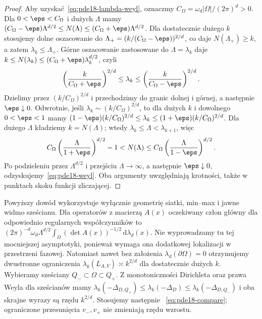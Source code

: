 \begin{proof}
Aby uzyskać~\eqref{eq:pde18-lambda-weyl}, oznaczmy
$C_\Omega=\omega_d|\Omega|/(2\pi)^d>0$. Dla
$0<\eps<C_\Omega$ i dużych $\Lambda$ mamy
$(C_\Omega-\eps)\Lambda^{d/2}\le N(\Lambda)
\le(C_\Omega+\eps)\Lambda^{d/2}$.
Dla dostatecznie dużego $k$ stosujemy dolne oszacowanie
do $\Lambda_+=(k/(C_\Omega-\eps))^{2/d}$, co daje
$N(\Lambda_+)\ge k$, a zatem $\lambda_k\le\Lambda_+$.
Górne oszacowanie zastosowane do $\Lambda=\lambda_k$
daje $k\le N(\lambda_k)\le(C_\Omega+\eps)\lambda_k^{d/2}$,
czyli
\[
 \left(\frac{k}{C_\Omega+\eps}\right)^{2/d}
 \le\lambda_k\le
 \left(\frac{k}{C_\Omega-\eps}\right)^{2/d}.
\]
Dzielimy przez $(k/C_\Omega)^{2/d}$ i przechodzimy
do granic dolnej i górnej, a następnie $\eps\downarrow0$.
Odwrotnie, jeśli $\lambda_k\sim(k/C_\Omega)^{2/d}$,
to dla dużych $k$ i dowolnego $0<\eps<1$ mamy
$(1-\eps)(k/C_\Omega)^{2/d}\le\lambda_k
\le(1+\eps)(k/C_\Omega)^{2/d}$. Dla dużego $\Lambda$
kładziemy $k=N(\Lambda)$; wtedy
$\lambda_k\le\Lambda<\lambda_{k+1}$, więc
\[
 C_\Omega\left(\frac{\Lambda}{1+\eps}\right)^{d/2}-1
 <N(\Lambda)\le
 C_\Omega\left(\frac{\Lambda}{1-\eps}\right)^{d/2}.
\]
Po podzieleniu przez $\Lambda^{d/2}$ i przejściu
$\Lambda\to\infty$, a następnie $\eps\downarrow0$,
odzyskujemy~\eqref{eq:pde18-weyl}. Oba argumenty
uwzględniają krotności, także w punktach skoku funkcji
zliczającej.
\end{proof}

\begin{uwaga}
Powyższy dowód wykorzystuje wyłącznie geometrię siatki,
min--max i jawne widmo sześcianu. Dla operatorów z macierzą
$A(x)$ oczekiwany człon główny dla odpowiednio regularnych
współczynników to
$(2\pi)^{-d}\omega_d\Lambda^{d/2}
\int_\Omega(\det A(x))^{-1/2}\,\mathrm d\lambda_d(x)$.
Nie wyprowadzamy tu tej mocniejszej asymptotyki, ponieważ
wymaga ona dodatkowej lokalizacji w przestrzeni fazowej.
Natomiast nawet bez założenia $\lambda_d(\partial\Omega)=0$
otrzymujemy dwustronne ograniczenia
$\lambda_k(L_{A,V})\asymp k^{2/d}$ dla dostatecznie
dużych $k$. Wybieramy sześciany $Q_-\subset\Omega\subset Q_+$.
Z monotoniczności Dirichleta oraz prawa Weyla dla sześcianów
mamy $\lambda_k(-\Delta_{D,Q_+})\le\lambda_k(-\Delta_D)
\le\lambda_k(-\Delta_{D,Q_-})$ i oba skrajne wyrazy
są rzędu $k^{2/d}$. Stosujemy następnie
~\eqref{eq:pde18-compare}; ograniczone przesunięcia
$v_-,v_+$ nie zmieniają rzędu wzrostu.
\end{uwaga}

